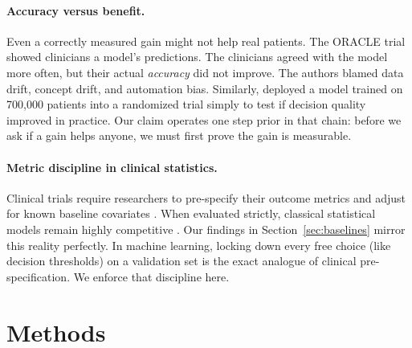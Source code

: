 \documentclass[a4paper,fleqn]{cas-sc}
\begin{document}
\paragraph{Accuracy versus benefit.} Even a correctly measured gain might not help real patients. The ORACLE trial \citep{fritz2024effect} showed clinicians a model's predictions. The clinicians agreed with the model more often, but their actual \emph{accuracy} did not improve. The authors blamed data drift, concept drift, and automation bias. Similarly, \citet{jayakumar2025shared} deployed a model trained on 700{,}000 patients into a randomized trial simply to test if decision quality improved in practice. Our claim operates one step prior in that chain: before we ask if a gain helps anyone, we must first prove the gain is measurable.
\paragraph{Metric discipline in clinical statistics.} Clinical trials require researchers to pre-specify their outcome metrics and adjust for known baseline covariates \citep{ylescupidez2023standardized}. When evaluated strictly, classical statistical models remain highly competitive \citep{mentz2021clinical}. Our findings in Section~\ref{sec:baselines} mirror this reality perfectly. In machine learning, locking down every free choice (like decision thresholds) on a validation set is the exact analogue of clinical pre-specification. We enforce that discipline here.
\section{Methods}
\label{sec:methods}
\end{document}
